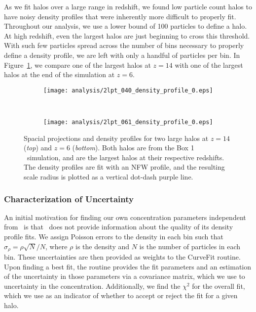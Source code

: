 As we fit halos over a large range in redshift, we found low particle count halos to have noisy density profiles that were inherently more difficult to properly fit.  Throughout our analysis, we use a lower bound of 100 particles to define a halo.  At high redshift, even the largest halos are just beginning to cross this threshold.  With such few particles spread across the number of bins necessary to properly define a density profile, we are left with only a handful of particles per bin.  In Figure~\ref{fig:fitting--density_profiles}, we compare one of the largest halos at $z = 14$ with one of the largest halos at the end of the simulation at $z = 6$.

\begin{figure}[t]
	\centering
	\begin{subfigure}{}
		\texttt{[image: analysis/2lpt\_040\_density\_profile\_0.eps]}
	\end{subfigure}
	\\
	\begin{subfigure}{}
		\texttt{[image: analysis/2lpt\_061\_density\_profile\_0.eps]}
	\end{subfigure}
	\caption[Density profiles for two large halos at $z = 14$ and $z = 6$.]{\footnotesize Spacial projections and density profiles for two large halos at $z = 14$ (\emph{top}) and $z = 6$ (\emph{bottom}).  Both halos are from the Box 1 \lpt\ simulation, and are the largest halos at their respective redshifts.  The density profiles are fit with an NFW profile, and the resulting scale radius is plotted as a vertical dot-dash purple line.}
	\label{fig:fitting--density_profiles}
\end{figure}



\subsubsection{Characterization of Uncertainty}
\label{subsubsec:analysis--profile_fitting--uncertainty}


An initial motivation for finding our own concentration parameters independent from \rockstar\ is that \rockstar\ does not provide information about the quality of its density profile fits.  We assign Poisson errors to the density in each bin such that $\sigma_{\rho} = \rho \sqrt{N} / N$, where $\rho$ is the density and $N$ is the number of particles in each bin.  These uncertainties are then provided as weights to the CurveFit routine.  Upon finding a best fit, the routine provides the fit parameters and an estimation of the uncertainty in those parameters via a covariance matrix, which we use to uncertainty in the concentration.  Additionally, we find the $\chi^{2}$ for the overall fit, which we use as an indicator of whether to accept or reject the fit for a given halo.



